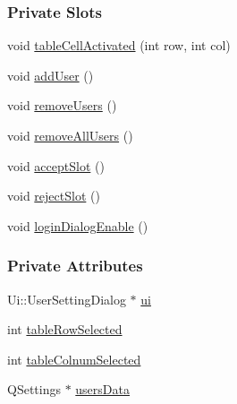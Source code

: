 \subsubsection*{Private Slots}
\begin{DoxyCompactItemize}
\item 
void \mbox{\hyperlink{classUserSettingDialog_adadac0b6a157e4fc15b5490f4e15b672}{table\+Cell\+Activated}} (int row, int col)
\item 
void \mbox{\hyperlink{classUserSettingDialog_a699172ed3d826f47823a5c7b2ee01cba}{add\+User}} ()
\item 
void \mbox{\hyperlink{classUserSettingDialog_a0c45242e9e0dc1ad4cf1960cca3575a4}{remove\+Users}} ()
\item 
void \mbox{\hyperlink{classUserSettingDialog_a5f4c353f8768d0225ac84f85607c4b54}{remove\+All\+Users}} ()
\item 
void \mbox{\hyperlink{classUserSettingDialog_a2efff8a9633f90bd27c990180b87b104}{accept\+Slot}} ()
\item 
void \mbox{\hyperlink{classUserSettingDialog_a46828cbc27d2dd2c587388090207dd8e}{reject\+Slot}} ()
\item 
void \mbox{\hyperlink{classUserSettingDialog_a9d077edc4d7cc247f8e57d1d6e8d7f89}{login\+Dialog\+Enable}} ()
\end{DoxyCompactItemize}
\subsubsection*{Private Attributes}
\begin{DoxyCompactItemize}
\item 
Ui\+::\+User\+Setting\+Dialog $\ast$ \mbox{\hyperlink{classUserSettingDialog_a915e2e661a7fe6fd265ec878f749cc82}{ui}}
\item 
int \mbox{\hyperlink{classUserSettingDialog_a965aa0e041af26cff9011bd8a04ad84c}{table\+Row\+Selected}}
\item 
int \mbox{\hyperlink{classUserSettingDialog_af4035cc2f93695c059c82ecd28ea70c8}{table\+Colnum\+Selected}}
\item 
Q\+Settings $\ast$ \mbox{\hyperlink{classUserSettingDialog_a2ea2a798911a3e2840542d7190613027}{users\+Data}}
\end{DoxyCompactItemize}


